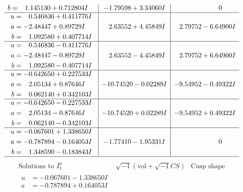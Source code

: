 \documentclass[1p]{elsarticle_modified}
\theoremstyle{definition}
\newcommand{\I}{\sqrt{-1}}
\begin{document}
$$\begin{array}{c|c|c}
\begin{aligned}
b &= \phantom{-}1.145130 + 0.712804 I\end{aligned}
 & -1.79598 + 3.34060 I & \phantom{-0.000000 } 0 \\ \hline\begin{aligned}
u &= \phantom{-}0.546836 + 0.411776 I \\
a &= -2.48447 + 0.89729 I \\
b &= \phantom{-}1.092580 + 0.407714 I\end{aligned}
 & \phantom{-}2.63552 + 4.45849 I & \phantom{-}2.79752 - 6.64900 I \\ \hline\begin{aligned}
u &= \phantom{-}0.546836 - 0.411776 I \\
a &= -2.48447 - 0.89729 I \\
b &= \phantom{-}1.092580 - 0.407714 I\end{aligned}
 & \phantom{-}2.63552 - 4.45849 I & \phantom{-}2.79752 + 6.64900 I \\ \hline\begin{aligned}
u &= -0.642650 + 0.227533 I \\
a &= \phantom{-}2.05134 + 0.87646 I \\
b &= \phantom{-}0.062140 + 0.342103 I\end{aligned}
 & -10.74520 - 0.02289 I & -9.54952 - 0.49322 I \\ \hline\begin{aligned}
u &= -0.642650 - 0.227533 I \\
a &= \phantom{-}2.05134 - 0.87646 I \\
b &= \phantom{-}0.062140 - 0.342103 I\end{aligned}
 & -10.74520 + 0.02289 I & -9.54952 + 0.49322 I \\ \hline\begin{aligned}
u &= -0.067601 + 1.338650 I \\
a &= -0.787894 - 0.164053 I \\
b &= \phantom{-}1.348590 - 0.183843 I\end{aligned}
 & -1.77410 - 1.95331 I & \phantom{-0.000000 } 0\\
 \hline 
 \end{array}$$\newpage$$\begin{array}{c|c|c}  
\text{Solutions to }I^u_{1}& \I (\text{vol} + \sqrt{-1}CS) & \text{Cusp shape}\\
 \hline 
\begin{aligned}
u &= -0.067601 - 1.338650 I \\
a &= -0.787894 + 0.164053 I \\

\end{aligned}
\end{array}$$
\end{document}
